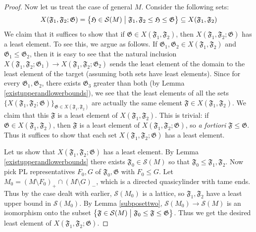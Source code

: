 \documentclass[12pt]{article}
\theoremstyle{plain}
\theoremstyle{definition}
\theoremstyle{remark}
\numberwithin{equation}{section}
\begin{document}
\begin{proof}
Now let us treat the case of general $M$.  Consider the following sets:
\begin{equation}
X(\mathfrak F_1,\mathfrak F_2;\mathfrak G)=\left\{\mathfrak H\in\mathcal S(M)\bigm|\mathfrak F_1,\mathfrak F_2\leq\mathfrak H\leq\mathfrak G\right\}\subseteq X(\mathfrak F_1,\mathfrak F_2)
\end{equation}
We claim that it suffices to show that if $\mathfrak G\in X(\mathfrak F_1,\mathfrak F_2)$, then $X(\mathfrak F_1,\mathfrak F_2;\mathfrak G)$ has a least element.  To see this, we argue as follows.  If $\mathfrak G_1,\mathfrak G_2\in X(\mathfrak F_1,\mathfrak F_2)$ and $\mathfrak G_1\leq\mathfrak G_2$, then it is easy to see that the natural inclusion $X(\mathfrak F_1,\mathfrak F_2;\mathfrak G_1)\to X(\mathfrak F_1,\mathfrak F_2;\mathfrak G_2)$ sends the least element of the domain to the least element of the target (assuming both sets have least elements).  Since for every $\mathfrak G_1,\mathfrak G_2$, there exists $\mathfrak G_3$ greater than both (by Lemma \ref{existupperandlowerbounds}), we see that the least elements of all the sets $\{X(\mathfrak F_1,\mathfrak F_2;\mathfrak G)\}_{\mathfrak G\in X(\mathfrak F_1,\mathfrak F_2)}$ are actually the same element $\mathfrak F\in X(\mathfrak F_1,\mathfrak F_2)$.  We claim that this $\mathfrak F$ is a least element of $X(\mathfrak F_1,\mathfrak F_2)$.  This is trivial: if $\mathfrak G\in X(\mathfrak F_1,\mathfrak F_2)$, then $\mathfrak F$ is a least element of $X(\mathfrak F_1,\mathfrak F_2;\mathfrak G)$, so \emph{a fortiori} $\mathfrak F\leq\mathfrak G$.  Thus it suffices to show that each set $X(\mathfrak F_1,\mathfrak F_2;\mathfrak G)$ has a least element.

Let us show that $X(\mathfrak F_1,\mathfrak F_2;\mathfrak G)$ has a least element.  By Lemma \ref{existupperandlowerbounds} there exists $\mathfrak F_0\in\mathcal S(M)$ so that $\mathfrak F_0\leq\mathfrak F_1,\mathfrak F_2$.  Now pick PL representatives $F_0,G$ of $\mathfrak F_0,\mathfrak G$ with $F_0\leq G$.  Let $M_0=(M\setminus F_0)_+\cap(M\setminus G)_-$, which is a directed quasicylinder with tame ends.  Thus by the case dealt with earlier, $\mathcal S(M_0)$ is a lattice, so $\mathfrak F_1,\mathfrak F_2$ have a least upper bound in $\mathcal S(M_0)$.  By Lemma \ref{subposettwo}, $\mathcal S(M_0)\to\mathcal S(M)$ is an isomorphism onto the subset $\left\{\mathfrak F\in\mathcal S(M)\bigm|\mathfrak F_0\leq\mathfrak F\leq\mathfrak G\right\}$.  Thus we get the desired least element of $X(\mathfrak F_1,\mathfrak F_2;\mathfrak G)$.
\end{proof}
\end{document}
